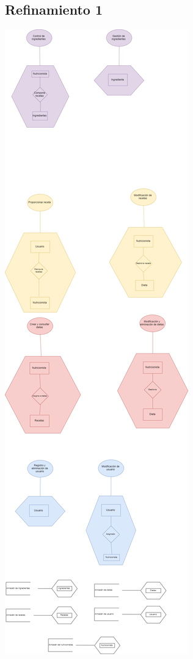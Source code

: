\documentclass[12pt,letterpaper]{article}
\begin{document}
\subsection{Refinamiento 1}
\includegraphics[scale=0.2]{externo1.png}
\end{document}

